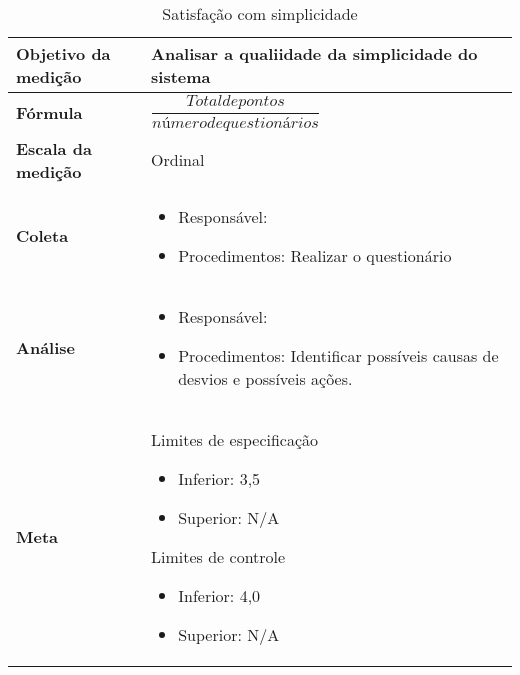 \begin{table}[H]
\centering
\begin{tabular}{|p{4cm}|p{5cm}|}
\hline
	\textbf{Objetivo da medição} &
	Analisar a qualiidade da simplicidade do sistema
	\\ \hline
	\textbf{Fórmula} &
	$\dfrac{Total de pontos}{número de questionários}$
	\\ \hline
	\textbf{Escala da medição} &
	Ordinal
	\\ \hline
	\textbf{Coleta} &
	\begin{itemize}
		\item Responsável: \stefania
		\item Procedimentos: Realizar o questionário
	\end{itemize}
	\\ \hline
	\textbf{Análise} &
	\begin{itemize}
		\item Responsável: \fabio
		\item Procedimentos: Identificar possíveis causas de desvios e possíveis ações.
	\end{itemize}
	\\ \hline
  \textbf{Meta} &
	Limites de especificação
		\begin{itemize}
			\item Inferior: 3,5
			\item Superior: N/A
		\end{itemize}
	Limites de controle
		\begin{itemize}
			\item Inferior: 4,0
			\item Superior: N/A
		\end{itemize}
  \\ \hline
\end{tabular}
\caption{Satisfação com simplicidade}
\label{tab:satisfacao_simplicidade}
\end{table}


